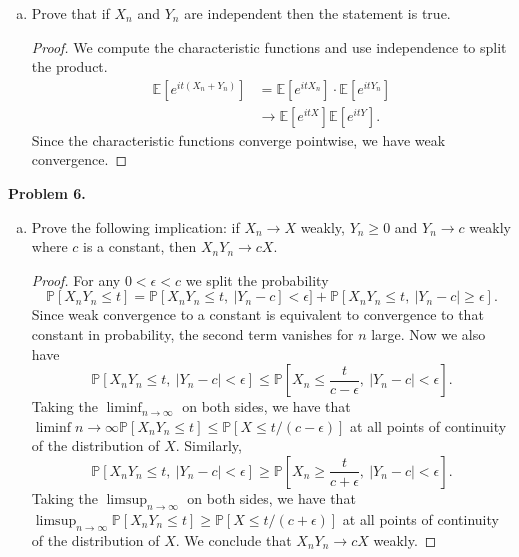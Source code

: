 \documentclass[11pt,letterpaper]{report}
\newcommand{\E}{\mathbb{E}}
\newcommand{\Prob}{\mathbb{P}}
\begin{document}
\begin{enumerate}[(a)]
	\item Prove that if $X_n$ and $Y_n$ are independent then the statement is true.
	\begin{proof}
		We compute the characteristic functions and use independence to split the product.
		\begin{align*}
			\E\left[e^{it(X_n+Y_n)}\right] &= \E\left[ e^{itX_n}\right]\cdot \E\left[e^{itY_n}\right]\\
			&\to \E\left[e^{itX}\right]\E\left[e^{itY}\right].
		\end{align*}
		Since the characteristic functions converge pointwise, we have weak convergence.
	\end{proof}
\end{enumerate}

\noindent\textbf{Problem 6. }
\begin{enumerate}[(a)]
	\item Prove the following implication: if $X_n\to X$ weakly, $Y_n\geq 0$ and $Y_n\to c$ weakly where $c$ is a constant, then $X_nY_n\to cX$.
	\begin{proof}
		For any $0<\epsilon<c$ we split the probability
		\[
		\Prob[X_nY_n \leq t]= \Prob[X_nY_n \leq t,\ |Y_n-c] <\epsilon] + \Prob[X_nY_n \leq t,\ |Y_n-c|\geq \epsilon].
		\]
		Since weak convergence to a constant is equivalent to convergence to that constant in probability, the second term vanishes for $n$ large. Now we also have 
		\[
		\Prob[X_n Y_n \leq t,\ |Y_n-c|<\epsilon] \leq \Prob[X_n \leq \frac{t}{c-\epsilon},\ |Y_n-c|<\epsilon].
		\]
		Taking the $\liminf_{n\to \infty}$ on both sides, we have that $\liminf{n\to \infty}\Prob[X_nY_n \leq t] \leq \Prob[X \leq t/(c-\epsilon)]$ at all points of continuity of the distribution of $X$. Similarly,
		\[
		\Prob[X_nY_n \leq t,\ |Y_n - c|<\epsilon] \geq \Prob[X_n \geq \frac{t}{c+\epsilon},\ |Y_n - c| < \epsilon].
		\]
		Taking the $\limsup_{n\to \infty}$ on both sides, we have that $\limsup_{n\to \infty}\Prob[X_nY_n \leq t] \geq \Prob[X \leq t/(c+\epsilon)]$ at all points of continuity of the distribution of $X$. We conclude that $X_nY_n \to cX$ weakly.
	\end{proof}


\end{enumerate}
\end{document}
